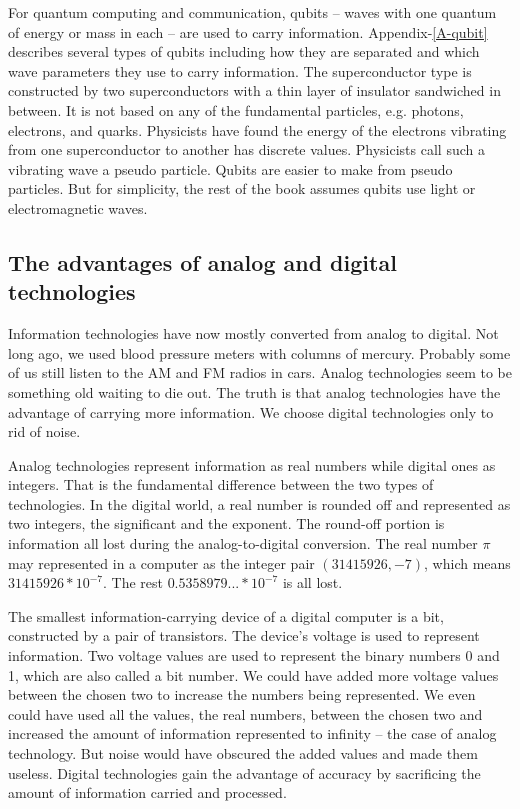 \documentclass[oneside, letter, 12pt]{book}
\begin{document}
For quantum computing and communication, qubits -- waves with one quantum of energy or mass in each -- are used to carry information. Appendix-\ref{A-qubit} describes several types of qubits including how they are separated and which wave parameters they use to carry information. The superconductor type is constructed by two superconductors with a thin layer of insulator sandwiched in between. It is not based on any of the fundamental particles, e.g. photons, electrons, and quarks. Physicists have found the energy of the electrons vibrating from one superconductor to another has discrete values. Physicists call such a vibrating wave a pseudo particle. Qubits are easier to make from pseudo particles. But for simplicity, the rest of the book assumes qubits use light or electromagnetic waves.

\subsection{The advantages of analog and digital technologies}
Information technologies have now mostly converted from analog to digital. Not long ago, we used blood pressure meters with columns of mercury. Probably some of us still listen to the AM and FM radios in cars. Analog technologies seem to be something old waiting to die out. The truth is that analog technologies have the advantage of carrying more information. We choose digital technologies only to rid of noise.

Analog technologies represent information as real numbers while digital ones as integers. That is the fundamental difference between the two types of technologies. In the digital world, a real number is rounded off and represented as two integers, the significant and the exponent. The round-off portion is information all lost during the analog-to-digital conversion. The real number $\pi$ may represented in a computer as the integer pair $(31415926, -7)$, which means $31415926*10^{-7}$. The rest $0.5358979...*10^{-7}$ is all lost.

The smallest information-carrying device of a digital computer is a bit, constructed by a pair of transistors. The device's voltage is used to represent information. Two voltage values are used to represent the binary numbers 0 and 1, which are also called a bit number. We could have added more voltage values between the chosen two to increase the numbers being represented. We even could have used all the values, the real numbers, between the chosen two and increased the amount of information represented to infinity -- the case of analog technology. But noise would have obscured the added values and made them useless. Digital technologies gain the advantage of accuracy by sacrificing the amount of information carried and processed. 
\end{document}
